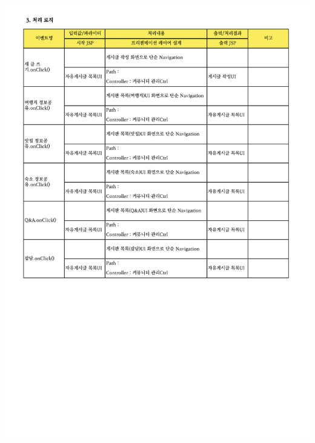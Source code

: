 {{{{{{{{{{{{{{{{{{{{{{{{{{{{{{{{{{{{{{{{{{{\includegraphics[width=20cm]{./Figure/Analysis/Display/community/community_02.pdf} \\
}}}}}}}}}}}}}}}}}}}}}}}}}}}}}}}}}}}}}}}}}}}
